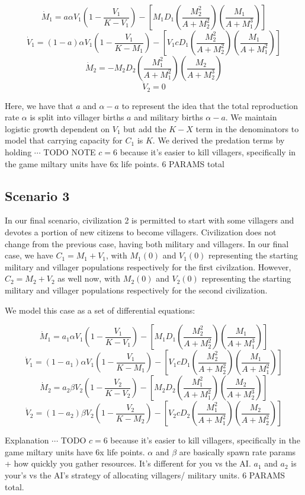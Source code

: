 \documentclass[12pt]{article}
\begin{document}
$$\dot M_1=a \alpha V_1(1-\frac{V_1}{K-V_1})-[M_1D_1(\frac{M_2^2}{A+M_2^2})(\frac{M_1}{A+M_1^3})]$$
$$\dot V_1=(1 - a) \alpha V_1(1-\frac{V_1}{K-M_1})-[V_1cD_1(\frac{M_2^2}{A+M_2^2})(\frac{M_1}{A +M_1^2})]$$
$$\dot M_2=-M_2 D_2(\frac{M_1^2}{A+M_1^2})(\frac{M_2}{A +M_2^3}) $$
$$\dot V_2 = 0 $$

Here, we have that $a$ and $\alpha - a$ to represent the idea that the total reproduction rate $\alpha$ is split into villager births $a$ and military births $\alpha - a$. We maintain logistic growth dependent on $V_1$ but add the $K - X$ term in the denominators to model that carrying capacity for $C_1$ is $K$. We derived the predation terms by holding $\cdots$ TODO NOTE $c = 6$ because it's easier to kill villagers, specifically in the game miltary units have 6x life points. 6 PARAMS total

\subsection{Scenario 3}

 In our final scenario, civilization 2 is permitted to start with some villagers and devotes a portion of new citizens to become villagers. Civilization does not change from the previous case, having both military and villagers. In our final case, we have $C_1 = M_1 + V_1$, with $M_1(0)$ and $V_1(0)$ representing the starting military and villager populations respectively for the first civilzation. However, $C_2 = M_2 + V_2$ as well now, with $M_2(0)$ and $V_2(0)$ representing the starting military and villager populations respectively for the second civilization. \par

We model this case as a set of differential equations: 

$$\dot M_1 =a_1 \alpha V_1(1-\frac{V_1}{K-V_1})-[M_1D_1(\frac{M_2^2}{A+M_2^2})(\frac{M_1}{A+M_1^3})]$$
$$\dot V_1=(1 - a_1) \alpha V_1(1-\frac{V_1}{K-M_1})-[V_1c D_1(\frac{M_2^2}{A+M_2^2})(\frac{M_1}{A +M_1^2})]$$
$$\dot M_2=a_2 \beta V_2(1-\frac{V_2}{K-V_2})-[M_2 D_2(\frac{M_1^2}{A+M_1^2})(\frac{M_2}{A +M_2^3})] $$
$$\dot V_2=(1 - a_2) \beta V_2(1-\frac{V_2}{K-M_2})-[V_2 c D_2(\frac{M_1^2}{A+M_1^2})(\frac{M_2}{A +M_2^2})] $$

Explanation $\cdots$ TODO $c = 6$ because it's easier to kill villagers, specifically in the game miltary units have 6x life points. $\alpha$ and $\beta$ are basically spawn rate params + how quickly you gather resources. It's different for you vs the AI. $a_1$ and $a_2$ is your's vs the AI's strategy of allocating villagers/ military units. 6 PARAMS total.
\end{document}
